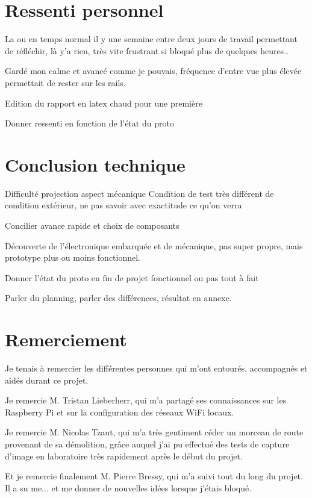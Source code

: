 \section{Ressenti personnel}
La ou en temps normal il y une semaine entre deux jours de travail permettant de réfléchir, là y'a rien, très vite frustrant si bloqué plus de quelques heures..

Gardé mon calme et avancé comme je pouvais, fréquence d'entre vue plus élevée permettait de rester sur les rails.

Edition du rapport en latex chaud pour une première

Donner ressenti en fonction de l'état du proto
\section{Conclusion technique}
Difficulté projection aspect mécanique
Condition de test très différent de condition extérieur, ne pas savoir avec exactitude ce qu'on verra

Concilier avance rapide et choix de composants

Découverte de l'électronique embarquée et de mécanique, pas super propre, mais prototype plus ou moins fonctionnel.

Donner l'état du proto en fin de projet fonctionnel ou pas tout à fait

Parler du planning, parler des différences, résultat en annexe.
\section{Remerciement}
Je tenais à remercier les différentes personnes qui m'ont entourés, accompagnés et aidés durant ce projet.

Je remercie M. Tristan Lieberherr, qui m'a partagé ses connaissances sur les Raspberry Pi et sur la configuration des réseaux WiFi locaux.

Je remercie M. Nicolas Tzaut, qui m'a très gentiment céder un morceau de route provenant de sa démolition, grâce auquel j'ai pu effectué
des tests de capture d'image en laboratoire très rapidement après le début du projet.

Et je remercie finalement M. Pierre Bressy, qui m'a suivi tout du long du projet. Il a su me... et me donner de nouvelles idées lorsque
j'étais bloqué.
\vfil
\hspace{8cm}\makeatletter\@author\makeatother\par
\hspace{8cm}\begin{minipage}{5cm}
    \printsignature
\end{minipage}